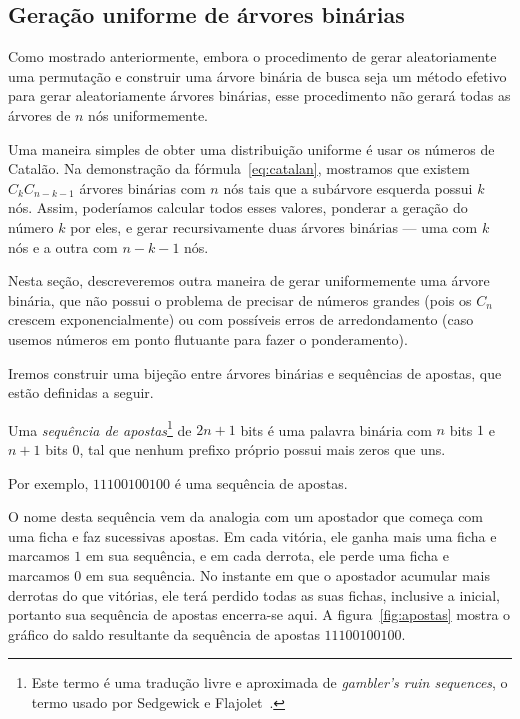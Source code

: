 \subsection{Geração uniforme de árvores binárias}

Como mostrado anteriormente,
embora o procedimento de gerar aleatoriamente uma permutação
e construir uma árvore binária de busca
seja um método efetivo para gerar aleatoriamente árvores binárias,
esse procedimento não gerará todas as árvores de $n$ nós uniformemente.

Uma maneira simples de obter uma distribuição uniforme
é usar os números de Catalão.
Na demonstração da fórmula~\ref{eq:catalan},
mostramos que existem $C_k C_{n-k-1}$ árvores binárias com $n$ nós
tais que a subárvore esquerda possui $k$ nós.
Assim,
poderíamos calcular todos esses valores,
ponderar a geração do número $k$ por eles,
e gerar recursivamente duas árvores binárias
--- uma com $k$ nós e a outra com $n - k - 1$ nós.

Nesta seção,
descreveremos outra maneira de gerar uniformemente uma árvore binária,
que não possui o problema de precisar de números grandes
(pois os $C_n$ crescem exponencialmente)
ou com possíveis erros de arredondamento
(caso usemos números em ponto flutuante para fazer o ponderamento).

Iremos construir uma bijeção entre árvores binárias e sequências de apostas,
que estão definidas a seguir.

\begin{definition}
    Uma \emph{sequência de apostas}\footnote{
        Este termo é uma tradução livre e aproximada de \emph{gambler's ruin sequences},
        o termo usado por Sedgewick e Flajolet~\cite[p.~268]{SedgewickFlajolet2013}.
    }
    de $2n+1$ bits
    é uma palavra binária com $n$ bits $1$ e $n+1$ bits $0$,
    tal que
    nenhum prefixo próprio possui mais zeros que uns.
\end{definition}

Por exemplo, $11100100100$ é uma sequência de apostas.

O nome desta sequência vem da analogia com um apostador
que começa com uma ficha e faz sucessivas apostas.
Em cada vitória, ele ganha mais uma ficha e marcamos $1$ em sua sequência,
e em cada derrota, ele perde uma ficha e marcamos $0$ em sua sequência.
No instante em que o apostador acumular mais derrotas do que vitórias,
ele terá perdido todas as suas fichas, inclusive a inicial,
portanto sua sequência de apostas encerra-se aqui.
A figura~\ref{fig:apostas}
mostra o gráfico do saldo resultante da sequência de apostas $11100100100$.

